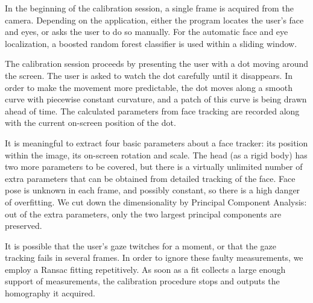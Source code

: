 In the beginning of the calibration session, a single frame is acquired from the camera.
Depending on the application, either the program locates the user's face and eyes, or asks the user to do so manually.
For the automatic face and eye localization, a boosted random forest classifier is used within a sliding window.

The calibration session proceeds by presenting the user with a dot moving around the screen.
The user is asked to watch the dot carefully until it disappears.
In order to make the movement more predictable, the dot moves along a smooth curve with piecewise constant curvature, and a patch of this curve is being drawn ahead of time.
The calculated parameters from face tracking are recorded along with the current on-screen position of the dot.

It is meaningful to extract four basic parameters about a face tracker: its position within the image, its on-screen rotation and scale.
The head (as a rigid body) has two more parameters to be covered, but there is a virtually unlimited number of extra parameters that can be obtained from detailed tracking of the face.
Face pose is unknown in each frame, and possibly constant, so there is a high danger of overfitting.
We cut down the dimensionality by Principal Component Analysis: out of the extra parameters, only the two largest principal components are preserved.

It is possible that the user's gaze twitches for a moment, or that the gaze tracking fails in several frames.
In order to ignore these faulty measurements, we employ a Ransac fitting repetitively.
As soon as a fit collects a large enough support of measurements, the calibration procedure stops and outputs the homography it acquired.

